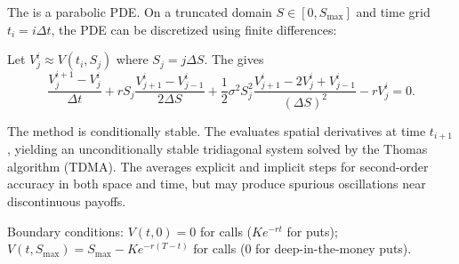 \begin{definition} \label{definition:finite_difference_methods_for_the_black_scholes_pde}
The  is a parabolic PDE. On a truncated domain $S \in [0, S_{\max}]$ and time grid $t_i = i\Delta t$, the PDE can be discretized using finite differences:

Let $V_j^i \approx V(t_i, S_j)$ where $S_j = j\Delta S$. The  gives
$$\frac{V_j^{i+1} - V_j^i}{\Delta t} + rS_j \frac{V_{j+1}^i - V_{j-1}^i}{2\Delta S} + \frac{1}{2}\sigma^2 S_j^2 \frac{V_{j+1}^i - 2V_j^i + V_{j-1}^i}{(\Delta S)^2} - rV_j^i = 0.$$

The method is conditionally stable. The  evaluates spatial derivatives at time $t_{i+1}$, yielding an unconditionally stable tridiagonal system solved by the Thomas algorithm (TDMA). The  averages explicit and implicit steps for second-order accuracy in both space and time, but may produce spurious oscillations near discontinuous payoffs.

Boundary conditions: $V(t, 0) = 0$ for calls ($K e^{-rt}$ for puts); $V(t, S_{\max}) = S_{\max} - K e^{-r(T-t)}$ for calls ($0$ for deep-in-the-money puts).
\end{definition}